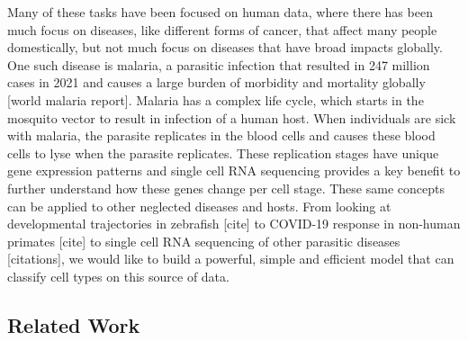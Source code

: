 \documentclass{article}
\begin{document}
Many of these tasks have been focused on human data, where there has been much focus on diseases, like different forms of cancer, that affect many people domestically, but not much focus on diseases that have broad impacts globally. One such disease is malaria, a parasitic infection that resulted in 247 million cases in 2021 and causes a large burden of morbidity and mortality globally [world malaria report]. Malaria has a complex life cycle, which starts in the mosquito vector to result in infection of a human host. When individuals are sick with malaria, the parasite replicates in the blood cells and causes these blood cells to lyse when the parasite replicates. These replication stages have unique gene expression patterns and single cell RNA sequencing provides a key benefit to further understand how these genes change per cell stage. These same concepts can be applied to other neglected diseases and hosts. From looking at developmental trajectories in zebrafish [cite] to COVID-19 response in non-human primates [cite] to single cell RNA sequencing of other parasitic diseases [citations], we would like to build a powerful, simple and efficient model that can classify cell types on this source of data.



\subsection{Related Work}
\end{document}

